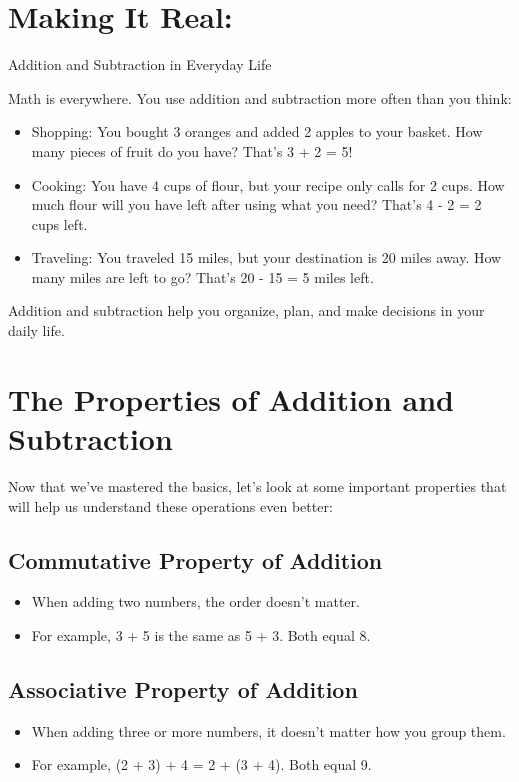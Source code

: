 \documentclass{book}
\begin{document}
\section{Making It Real:}
Addition and Subtraction in Everyday Life

Math is everywhere. You use addition and subtraction more often than you think:
\begin{itemize}
	\item Shopping: You bought 3 oranges and added 2 apples to your basket. How many pieces of fruit do you have? That’s 3 + 2 = 5!
	\item Cooking: You have 4 cups of flour, but your recipe only calls for 2 cups. How much flour will you have left after using what you need? That’s 4 - 2 = 2 cups left.
	\item Traveling: You traveled 15 miles, but your destination is 20 miles away. How many miles are left to go? That’s 20 - 15 = 5 miles left.
\end{itemize}
Addition and subtraction help you organize, plan, and make decisions in your daily life.

\section{The Properties of Addition and Subtraction}
Now that we’ve mastered the basics, let’s look at some important properties that will help us understand these operations even better:

\subsection{Commutative Property of Addition}
\begin{itemize}
	\item When adding two numbers, the order doesn’t matter.
	\item For example, 3 + 5 is the same as 5 + 3. Both equal 8.
\end{itemize}

\subsection{Associative Property of Addition}
\begin{itemize}
	\item When adding three or more numbers, it doesn’t matter how you group them.
	\item For example, (2 + 3) + 4 = 2 + (3 + 4). Both equal 9.
\end{itemize}
\end{document}
